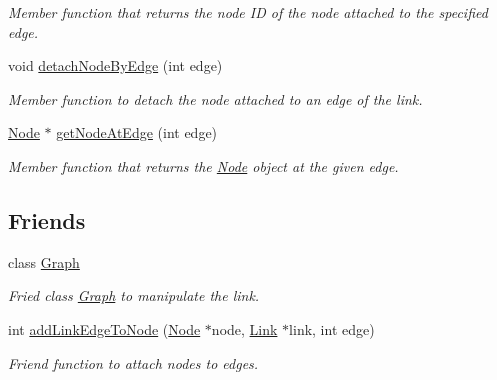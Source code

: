 \begin{DoxyCompactItemize}
\begin{DoxyCompactList}\small\item\em Member function that returns the node I\-D of the node attached to the specified edge. \end{DoxyCompactList}\item 
\hypertarget{classLink_a16589e17a3f22a5038b3c708d70bf5ea}{void \hyperlink{classLink_a16589e17a3f22a5038b3c708d70bf5ea}{detach\-Node\-By\-Edge} (int edge)}\label{classLink_a16589e17a3f22a5038b3c708d70bf5ea}

\begin{DoxyCompactList}\small\item\em Member function to detach the node attached to an edge of the link. \end{DoxyCompactList}\item 
\hypertarget{classLink_a901e3ffdb61055396977a5418d446535}{\hyperlink{classNode}{Node} $\ast$ \hyperlink{classLink_a901e3ffdb61055396977a5418d446535}{get\-Node\-At\-Edge} (int edge)}\label{classLink_a901e3ffdb61055396977a5418d446535}

\begin{DoxyCompactList}\small\item\em Member function that returns the \hyperlink{classNode}{Node} object at the given edge. \end{DoxyCompactList}\end{DoxyCompactItemize}
\subsection*{Friends}
\begin{DoxyCompactItemize}
\item 
\hypertarget{classLink_afab89afd724f1b07b1aaad6bdc61c47a}{class \hyperlink{classLink_afab89afd724f1b07b1aaad6bdc61c47a}{Graph}}\label{classLink_afab89afd724f1b07b1aaad6bdc61c47a}

\begin{DoxyCompactList}\small\item\em Fried class \hyperlink{classGraph}{Graph} to manipulate the link. \end{DoxyCompactList}\item 
\hypertarget{classLink_a1cccce22df97e21e1e0e0cd3ca6526b0}{int \hyperlink{classLink_a1cccce22df97e21e1e0e0cd3ca6526b0}{add\-Link\-Edge\-To\-Node} (\hyperlink{classNode}{Node} $\ast$node, \hyperlink{classLink}{Link} $\ast$link, int edge)}\label{classLink_a1cccce22df97e21e1e0e0cd3ca6526b0}

\begin{DoxyCompactList}\small\item\em Friend function to attach nodes to edges. \end{DoxyCompactList}\end{DoxyCompactItemize}



